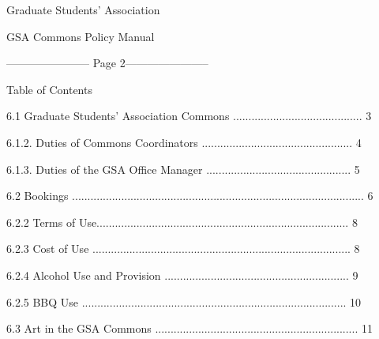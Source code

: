                                                

                                             Graduate Students’ Association  

                                             GSA Commons Policy Manual  

  


----------------------- Page 2-----------------------

                                                Table of Contents  

                                                  

  

6.1         Graduate Students’ Association Commons .......................................... 3  



    6.1.2.         Duties of Commons Coordinators ................................................. 4  



    6.1.3.         Duties of the GSA Office Manager ............................................... 5  



6.2         Bookings ............................................................................................... 6  



    6.2.2          Terms of Use.................................................................................. 8  



    6.2.3          Cost of Use .................................................................................... 8  



    6.2.4          Alcohol Use and Provision ............................................................ 9  



    6.2.5          BBQ Use ...................................................................................... 10  



6.3        Art in the GSA Commons .................................................................. 11  

                                               

                                               

                                               


